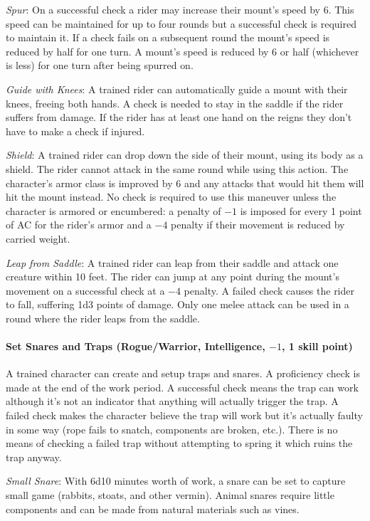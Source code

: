 \begin{multicols}{2}
\textit{Spur}: On a successful check a rider may increase their mount's speed by 6.  This speed can be maintained for up to four rounds but a successful check is required to maintain it.  If a check fails on a subsequent round the mount's speed is reduced by half for one turn.  A mount's speed is reduced by 6 or half (whichever is less) for one turn after being spurred on.

\textit{Guide with Knees}: A trained rider can automatically guide a mount with their knees, freeing both hands.  A check is needed to stay in the saddle if the rider suffers from damage.  If the rider has at least one hand on the reigns they don't have to make a check if injured.

\textit{Shield}: A trained rider can drop down the side of their mount, using its body as a shield.  The rider cannot attack in the same round while using this action.  The character's armor class is improved by 6 and any attacks that would hit them will hit the mount instead.  No check is required to use this maneuver unless the character is armored or encumbered: a penalty of $-1$ is imposed for every 1 point of AC for the rider's armor and a $-4$ penalty if their movement is reduced by carried weight.

\textit{Leap from Saddle}: A trained rider can leap from their saddle and attack one creature within 10 feet.  The rider can jump at any point during the mount's movement on a successful check at a $-4$ penalty.  A failed check causes the rider to fall, suffering 1d3 points of damage.  Only one melee attack can be used in a round where the rider leaps from the saddle.

\paragraph{Set Snares and Traps (Rogue/Warrior, Intelligence, $-1$, 1 skill point)}

A trained character can create and setup traps and snares.  A proficiency check is made at the end of the work period.  A successful check means the trap can work although it's not an indicator that anything will actually trigger the trap.  A failed check makes the character believe the trap will work but it's actually faulty in some way (rope fails to snatch, components are broken, etc.). There is no means of checking a failed trap without attempting to spring it which ruins the trap anyway.

\textit{Small Snare}: With 6d10 minutes worth of work, a snare can be set to capture small game (rabbits, stoats, and other vermin).  Animal snares require little components and can be made from natural materials such as vines.  


\end{multicols}
